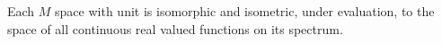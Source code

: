 Each $M$ space with unit is isomorphic and isometric, under evaluation, to the space of all continuous real valued functions on its spectrum.
